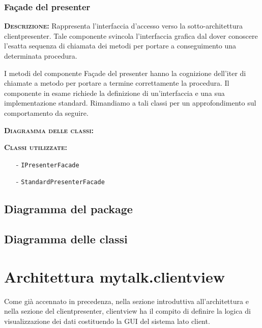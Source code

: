 \subsubsection{Façade del presenter}
\begin{description}
	\item{\scshape\bfseries Descrizione:} 
Rappresenta l'interfaccia d'accesso verso la sotto-architettura clientpresenter. Tale componente svincola l'interfaccia grafica dal dover conoscere l'esatta sequenza di chiamata dei metodi per portare a conseguimento una determinata procedura.

I metodi del componente Façade del presenter hanno la cognizione dell'iter di chiamate a metodo per portare a termine correttamente la procedura. Il componente in esame richiede la definizione di un'interfaccia e una sua implementazione standard. Rimandiamo a tali classi per un approfondimento sul comportamento da seguire.
	\item{\scshape\bfseries Diagramma delle classi:}
	\item{\scshape\bfseries Classi utilizzate:} 
	\begin{itemize}[noitemsep,nolistsep]
		\item[-] \texttt{IPresenterFacade}
		\item[-] \texttt{StandardPresenterFacade}
	\end{itemize}
\end{description}

\subsection{Diagramma del package}

\subsection{Diagramma delle classi}
\clearpage

\section{Architettura mytalk.clientview}
Come già accennato in precedenza, nella sezione introduttiva all'architettura e nella sezione del clientpresenter, clientview ha il compito di definire la logica di visualizzazione dei dati costituendo la GUI del sistema lato client.

